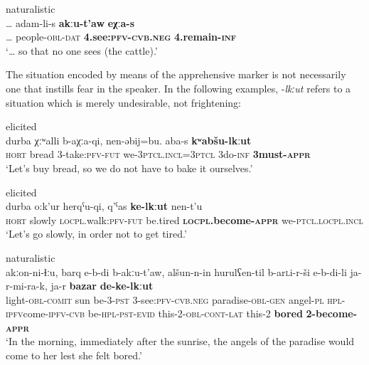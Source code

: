 \documentclass[output=paper,colorlinks,citecolor=brown]{langscibook}
\begin{document}
\ea \label{ex:DD16} \textnormal{naturalistic} \\
\gll … adam-li-s \textbf{akːu-t'aw} \textbf{eχːa-s} \\
… people-\textsc{obl-dat} \textbf{4.see:\textsc{pfv-cvb.neg}} \textbf{4.remain-\textsc{inf}} \\
\glt `… so that no one sees (the cattle).'
\z


 The situation encoded by means of the apprehensive marker is not necessarily one that instills fear in the speaker. In the following examples, \nobreakdash-\textit{lkːut} refers to a situation which is merely undesirable, not frightening:
 

\ea \label{ex:DD17} \textnormal{elicited} \\
\gll durba χːʷalli b-aχːa-qi, nen-ə{\textlangle}b{\textrangle}ij=bu. a{\textlangle}b{\textrangle}a-s \textbf{kʷa{\textlangle}b{\textrangle}šu-lkːut} \\
\textsc{hort} bread 3-take:\textsc{pfv-fut} we-{\textlangle}3{\textrangle}\textsc{ptcl.incl}={\textlangle}3{\textrangle}\textsc{ptcl} {\textlangle}3{\textrangle}do-\textsc{inf} \textbf{{\textlangle}3{\textrangle}must-\textsc{appr}} \\
\glt `Let's buy bread, so we do not have to bake it ourselves.'
\z


\ea \label{ex:DD18} \textnormal{elicited} \\
\gll durba o:k'ur herqˁu-qi, q'ˁas \textbf{ke-lkːut} nen-t'u \\
\textsc{hort} slowly \textsc{locpl}.walk:\textsc{pfv-fut} be.tired \textbf{\textsc{locpl}.become-\textsc{appr}} we-\textsc{ptcl.locpl.incl} \\
\glt `Let's go slowly, in order not to get tired.'
\z

    \ea \label{ex:DD19} \textnormal{naturalistic}\\
\gll akːon-ni-ɬːu, barq e-b-di b-akːu-t'aw, alšun-n-in hurulʕen-til b-a{\textlangle}r{\textrangle}\textsc{l}i-r-ši e-b-di-li ja-r-mi-ra-k, ja-r \textbf{bazar} \textbf{de-ke-lkːut} \\
light-\textsc{obl-comit} sun be-3-\textsc{pst} 3-see:\textsc{pfv-cvb.neg} paradise-\textsc{obl-gen} angel-\textsc{pl} \textsc{hpl}-{\textlangle}\textsc{ipfv}{\textrangle}come-\textsc{ipfv-cvb} be-\textsc{hpl-pst-evid} this-2-\textsc{obl-cont-lat} this-2 \textbf{bored} \textbf{2-become-\textsc{appr}} \\
\glt `In the morning, immediately after the sunrise, the angels of the paradise would come to her lest she felt bored.'
\z
\end{document}
